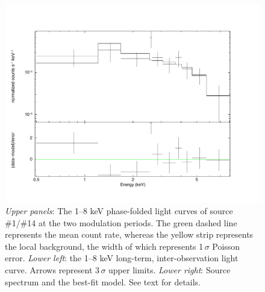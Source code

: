 \documentclass[fleqn,usenatbib]{mnras}
\begin{document}
\begin{figure}
\begin{minipage}[t]{0.45\textwidth}
\includegraphics[width=1.02\textwidth]{./figure/LW/324001_spec.pdf}
\end{minipage}
\caption{{\it Upper panels}: The 1--8 keV phase-folded light curves of source \#1/\#14 at the two modulation periods.
The green dashed line represents the mean count rate, whereas the yellow strip represents the local background, the width of which represents 1\,$\sigma$ Poisson error.
{\it Lower left}: the 1--8 keV long-term, inter-observation light curve. Arrows represent 3\,$\sigma$ upper limits. 
{\it Lower right}: Source spectrum and the best-fit model. See text for details.}
\label{fig:pCV_sample_1}
\end{figure}
\end{document}
